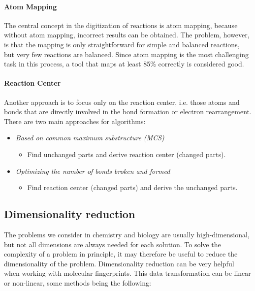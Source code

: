 \paragraph{Atom Mapping}
The central concept in the digitization of reactions is atom mapping, because without atom mapping, incorrect results can be obtained. The problem, however, is that the mapping is only straightforward for simple and balanced reactions, but very few reactions are balanced. Since atom mapping is the most challenging task in this process, a tool that maps at least 85\% correctly is considered good.

\paragraph{Reaction Center}
Another approach is to focus only on the reaction center, i.e. those atoms and bonds that are directly involved in the bond formation or electron rearrangement. There are two main approaches for algorithms:

\begin{itemize}
    \item \emph{Based on common maximum substructure (MCS)}
    \begin{itemize}
        \item Find unchanged parts and derive reaction center (changed parts).
    \end{itemize}
    \item \emph{Optimizing the number of bonds broken and formed}
    \begin{itemize}
        \item Find reaction center (changed parts) and derive the unchanged parts.
    \end{itemize}
\end{itemize}

\subsection{Dimensionality reduction}

The problems we consider in chemistry and biology are usually high-dimensional, but not all dimensions are always needed for each solution. To solve the complexity of a problem in principle, it may therefore be useful to reduce the dimensionality of the problem. Dimensionality reduction can be very helpful when working with molecular fingerprints. This data transformation can be linear or non-linear, some methods being the following:


